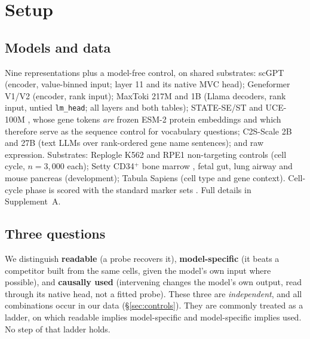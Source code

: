 \documentclass[11pt]{article}
\begin{document}
\section{Setup}

\subsection{Models and data}
Nine representations plus a model-free control, on shared substrates: scGPT \citep{cui2024scgpt}
(encoder, value-binned input; layer 11 and its native MVC head); Geneformer V1/V2
\citep{theodoris2023geneformer} (encoder, rank input); MaxToki 217M and 1B (Llama decoders, rank input,
untied \texttt{lm\_head}; all layers and both tables); STATE-SE/ST \citep{adduri2025state} and UCE-100M
\citep{rosen2026uce}, whose gene tokens \emph{are} frozen ESM-2 protein embeddings
\citep{lin2023esm2} and which therefore serve as the sequence control for vocabulary questions;
C2S-Scale 2B and 27B \citep{levine2024cell2sentence,rizvi2025c2sscale} (text LLMs over rank-ordered
gene name sentences); and raw expression. Substrates: Replogle K562 and RPE1 non-targeting controls
\citep{replogle2022genomewide} (cell cycle, $n=3{,}000$ each); Setty CD34$^+$ bone marrow
\citep{setty2019palantir}, fetal gut, lung airway and mouse pancreas \citep{bastidasponce2019pancreas}
(development); Tabula Sapiens \citep{tabulasapiens2022} (cell type and gene context). Cell-cycle phase
is scored with the standard marker sets \citep{tirosh2016melanoma,whitfield2002cellcycle}. Full details
in Supplement~A.

\subsection{Three questions}
We distinguish \textbf{readable} (a probe recovers it), \textbf{model-specific} (it beats a competitor
built from the same cells, given the model's own input where possible), and \textbf{causally used}
(intervening changes the model's own output, read through its native head, not a fitted probe).
These three are \emph{independent}, and all combinations occur in our data
(\S\ref{sec:controls}). They are commonly treated as a ladder, on which readable implies
model-specific and model-specific implies used. No step of that ladder holds.
\end{document}
